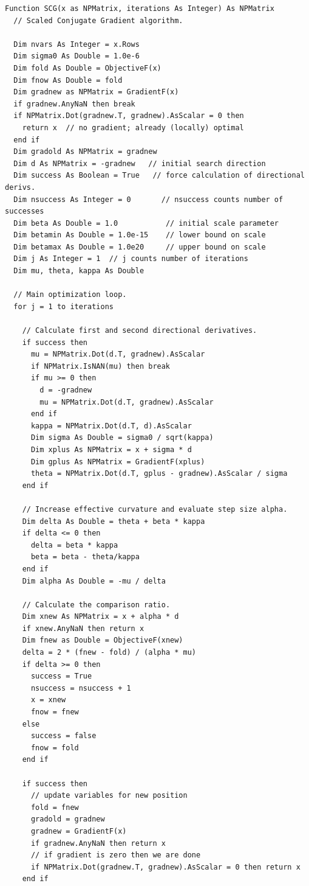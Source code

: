 \documentclass{article}
\begin{document}
\begin{lstlisting}
Function SCG(x as NPMatrix, iterations As Integer) As NPMatrix
  // Scaled Conjugate Gradient algorithm.
  
  Dim nvars As Integer = x.Rows
  Dim sigma0 As Double = 1.0e-6
  Dim fold As Double = ObjectiveF(x)
  Dim fnow As Double = fold
  Dim gradnew as NPMatrix = GradientF(x)
  if gradnew.AnyNaN then break
  if NPMatrix.Dot(gradnew.T, gradnew).AsScalar = 0 then
    return x  // no gradient; already (locally) optimal
  end if
  Dim gradold As NPMatrix = gradnew
  Dim d As NPMatrix = -gradnew   // initial search direction
  Dim success As Boolean = True   // force calculation of directional derivs.
  Dim nsuccess As Integer = 0       // nsuccess counts number of successes
  Dim beta As Double = 1.0           // initial scale parameter
  Dim betamin As Double = 1.0e-15    // lower bound on scale
  Dim betamax As Double = 1.0e20     // upper bound on scale
  Dim j As Integer = 1  // j counts number of iterations
  Dim mu, theta, kappa As Double
  
  // Main optimization loop.
  for j = 1 to iterations
    
    // Calculate first and second directional derivatives.
    if success then
      mu = NPMatrix.Dot(d.T, gradnew).AsScalar
      if NPMatrix.IsNAN(mu) then break
      if mu >= 0 then
        d = -gradnew
        mu = NPMatrix.Dot(d.T, gradnew).AsScalar
      end if
      kappa = NPMatrix.Dot(d.T, d).AsScalar
      Dim sigma As Double = sigma0 / sqrt(kappa)
      Dim xplus As NPMatrix = x + sigma * d
      Dim gplus As NPMatrix = GradientF(xplus)
      theta = NPMatrix.Dot(d.T, gplus - gradnew).AsScalar / sigma
    end if
    
    // Increase effective curvature and evaluate step size alpha.
    Dim delta As Double = theta + beta * kappa
    if delta <= 0 then
      delta = beta * kappa
      beta = beta - theta/kappa
    end if
    Dim alpha As Double = -mu / delta
    
    // Calculate the comparison ratio.
    Dim xnew As NPMatrix = x + alpha * d
    if xnew.AnyNaN then return x
    Dim fnew as Double = ObjectiveF(xnew)
    delta = 2 * (fnew - fold) / (alpha * mu)
    if delta >= 0 then 
      success = True
      nsuccess = nsuccess + 1
      x = xnew
      fnow = fnew
    else
      success = false
      fnow = fold
    end if
    
    if success then
      // update variables for new position
      fold = fnew
      gradold = gradnew
      gradnew = GradientF(x)
      if gradnew.AnyNaN then return x
      // if gradient is zero then we are done
      if NPMatrix.Dot(gradnew.T, gradnew).AsScalar = 0 then return x
    end if
    

\end{lstlisting}
\end{document}
